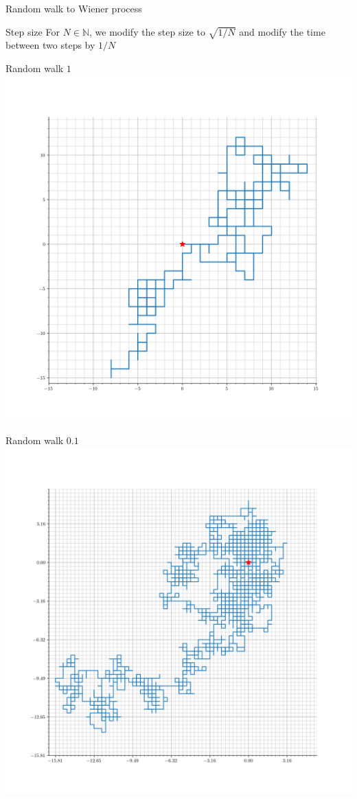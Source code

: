 \documentclass[color=usenames,dvipsnames]{beamer}
\begin{document}
\begin{frame}{Random walk to Wiener process}
    \begin{block}
        {Step size}
        For $N\in\mathbb{N}$, we modify the step size to $\sqrt{1/N}$ and modify the time between two steps by $1/N$
    \end{block}
\end{frame}

\begin{frame}{Random walk $1$}
    \includegraphics[width=0.8\linewidth]{Control_lecture_notes/Figs/rw_2d_1.png}
\end{frame}
\begin{frame}{Random walk $0.1$}
    \includegraphics[width=0.8\linewidth]{Control_lecture_notes/Figs/rw_2d_10.png}
\end{frame}
\end{document}
